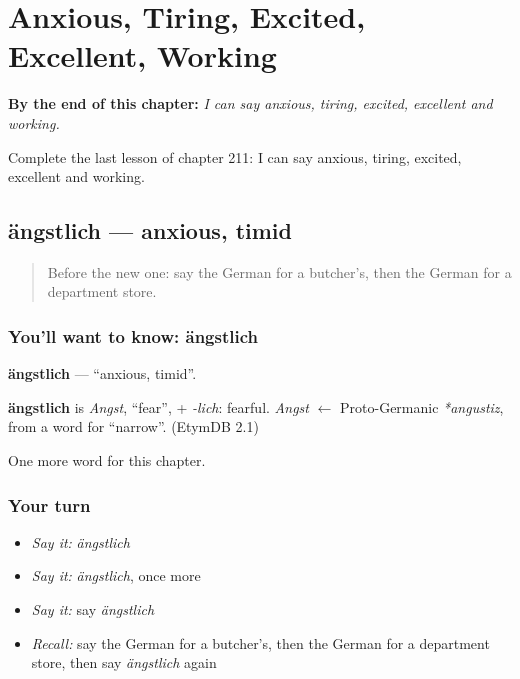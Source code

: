 
\chapter{Anxious, Tiring, Excited, Excellent, Working}
\label{ch:ge-anxious-tiring-excited-excellent-working}

\begin{chapteropening}
\textbf{By the end of this chapter:} \emph{I can say anxious, tiring, excited, excellent and working.}

Complete the last lesson of chapter 211: I can say anxious, tiring, excited, excellent and working.
\end{chapteropening}

\section[ängstlich]{ängstlich — anxious, timid}

\label{lesson:GE-C211-aengstlich}



\begin{quote}
Before the new one: say the German for a butcher's, then the German for a department store.
\end{quote}

\subsection*{You'll want to know: ängstlich}
\textbf{ängstlich} — \textquotedblleft{}anxious, timid\textquotedblright{}.

\begin{cousinweb}
\textbf{ängstlich} is \emph{Angst}, \textquotedblleft{}fear\textquotedblright{}, + \emph{-lich}: fearful. \emph{Angst} $\leftarrow$ Proto-Germanic \emph{*angustiz}, from a word for \textquotedblleft{}narrow\textquotedblright{}. (EtymDB 2.1)
\end{cousinweb}

\begin{grammarlens}[title={What you've built}]
One more word for this chapter.
\end{grammarlens}

\subsection*{Your turn}
\begin{itemize}
\raggedright
  \item \emph{Say it:} \emph{ängstlich}
  \item \emph{Say it:} \emph{ängstlich}, once more
  \item \emph{Say it:} say \emph{ängstlich}
  \item \emph{Recall:} say the German for a butcher's, then the German for a department store, then say \emph{ängstlich} again
\end{itemize}

